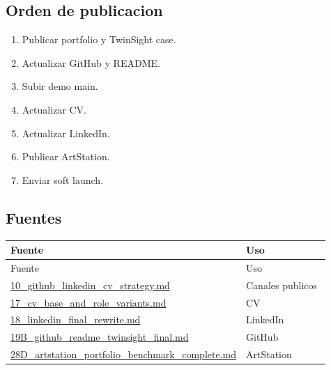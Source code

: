 \subsection{Orden de publicacion}


\begin{enumerate}
\item Publicar portfolio y TwinSight case.
\item Actualizar GitHub y README.
\item Subir demo main.
\item Actualizar CV.
\item Actualizar LinkedIn.
\item Publicar ArtStation.
\item Enviar soft launch.
\end{enumerate}


\subsection{Fuentes}


\begin{center}
\scriptsize
\begin{longtable}{>{\raggedright\arraybackslash}p{0.455\linewidth} >{\raggedright\arraybackslash}p{0.455\linewidth}}
\toprule
Fuente & Uso \\
\midrule
\endfirsthead
\toprule
Fuente & Uso \\
\midrule
\endhead
\href{file:///E:/Laboral/10_github_linkedin_cv_strategy.md}{10\_github\_linkedin\_cv\_strategy.md} & Canales publicos \\
\href{file:///E:/Laboral/17_cv_base_and_role_variants.md}{17\_cv\_base\_and\_role\_variants.md} & CV \\
\href{file:///E:/Laboral/18_linkedin_final_rewrite.md}{18\_linkedin\_final\_rewrite.md} & LinkedIn \\
\href{file:///E:/Laboral/19B_github_readme_twinsight_final.md}{19B\_github\_readme\_twinsight\_final.md} & GitHub \\
\href{file:///E:/Laboral/28D_artstation_portfolio_benchmark_complete.md}{28D\_artstation\_portfolio\_benchmark\_complete.md} & ArtStation \\
\bottomrule
\end{longtable}
\end{center}
